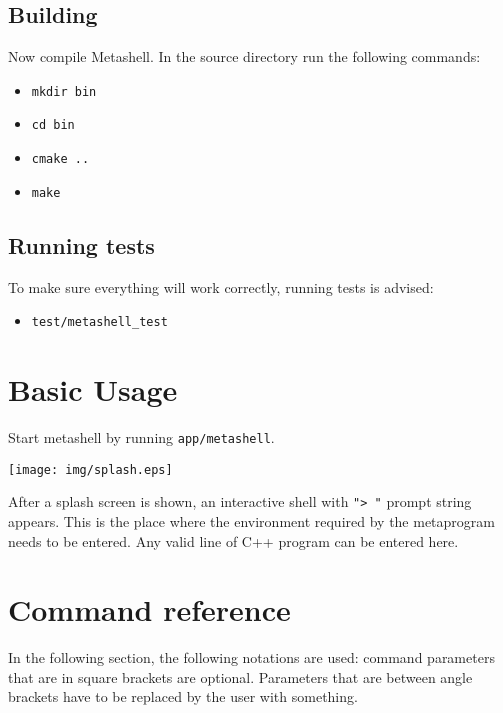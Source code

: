 \subsection{Building}

Now compile Metashell. In the source directory run the following commands:

\begin{itemize}
    \item \lstinline$mkdir bin$
    \item \lstinline$cd bin$
    \item \lstinline$cmake ..$
    \item \lstinline$make$
\end{itemize}

\subsection{Running tests}

To make sure everything will work correctly, running tests is advised:

\begin{itemize}
    \item \lstinline$test/metashell_test$
\end{itemize}

\section{Basic Usage}

Start metashell by running \lstinline$app/metashell$.

\texttt{[image: img/splash.eps]}

After a splash screen is shown, an interactive shell with \lstinline$"> "$
prompt string appears. This is the place where the environment required by the
metaprogram needs to be entered. Any valid line of C++ program can be entered
here.


\section{Command reference}

In the following section, the following notations are used: command parameters
that are in square brackets are optional. Parameters that are between angle
brackets have to be replaced by the user with something.




